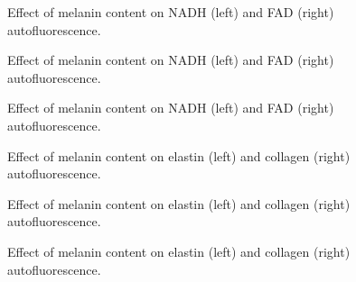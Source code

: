 \begin{appendices}
\begin{figure}[!htbp]
    \centering
    \caption{Effect of melanin content on NADH (left) and FAD (right) autofluorescence.}%
    \label{fig:320nadhfad-melanin}%
\end{figure}

\begin{figure}[!htbp]
    \centering
    \caption{Effect of melanin content on NADH (left) and FAD (right) autofluorescence.}%
    \label{fig:365nadhfad-melanin}%
\end{figure}

\begin{figure}[!htbp]
    \centering
    \caption{Effect of melanin content on NADH (left) and FAD (right) autofluorescence.}%
    \label{fig:450nadhfad-melanin}%
\end{figure}


\begin{figure}[!htbp]
    \centering
    \caption{Effect of melanin content on elastin (left) and collagen (right) autofluorescence.}%
    \label{fig:260elastincollagen-melanin}%
\end{figure}

\begin{figure}[!htbp]
    \centering
    \caption{Effect of melanin content on elastin (left) and collagen (right) autofluorescence.}%
    \label{fig:320elastincollagen-melanin}%
\end{figure}

\begin{figure}[!htbp]
    \centering
    \caption{Effect of melanin content on elastin (left) and collagen (right) autofluorescence.}%
    \label{fig:365elastincollagen-melanin}%
\end{figure}


\end{appendices}
